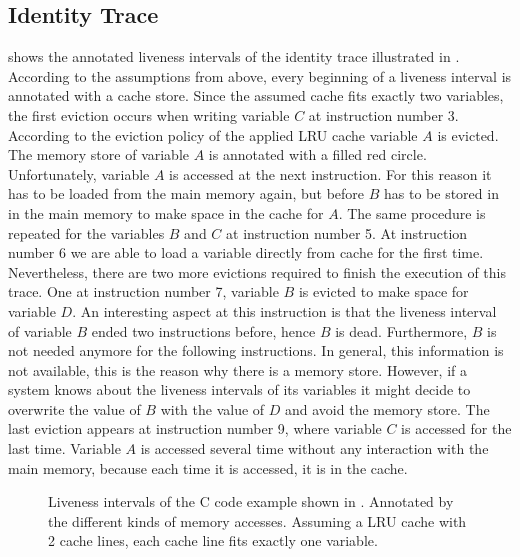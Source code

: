 \documentclass[onecolumn, openright, master, english, signatures]{dbrgrptt}
\begin{document}
\subsection{Identity Trace}
 shows the annotated liveness intervals of the identity \ac{trace} illustrated in .
According to the assumptions from above, every beginning of a liveness interval is annotated with a cache store.
Since the assumed cache fits exactly two variables, the first eviction occurs when writing variable $C$ at instruction number 3.
According to the eviction policy of the applied \ac{LRU} cache variable $A$ is evicted.
The memory store of variable $A$ is annotated with a filled red circle.
Unfortunately, variable $A$ is accessed at the next instruction.
For this reason it has to be loaded from the main memory again, but before $B$ has to be stored in in the main memory to make space in the cache for $A$.
The same procedure is repeated for the variables $B$ and $C$ at instruction number 5.
At instruction number 6 we are able to load a variable directly from cache for the first time.
Nevertheless, there are two more evictions required to finish the execution of this trace.
One at instruction number 7, variable $B$ is evicted to make space for variable $D$.
An interesting aspect at this instruction is that the liveness interval of variable $B$ ended two instructions before, hence $B$ is dead.
Furthermore, $B$ is not needed anymore for the following instructions.
In general, this information is not available, this is the reason why there is a memory store.
However, if a system knows about the liveness intervals of its variables it might decide to overwrite the value of $B$ with the value of $D$ and avoid the memory store.
The last eviction appears at instruction number 9, where variable $C$ is accessed for the last time. Variable $A$ is accessed several time without any interaction with the main memory, because each time it is accessed, it is in the cache.

\begin{figure}[!ht]
  \centering
  
  \caption{Liveness intervals of the C code example shown in . Annotated by the different kinds of memory accesses. Assuming a LRU cache with 2 cache lines, each cache line fits exactly one variable.}
  \label{fig:trace-transformation-original-marked}
\end{figure}
\end{document}
